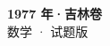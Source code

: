 \documentclass[zihao=-4, a4paper]{ctexart}
\begin{document}
\begin{center}
  {\Large\bfseries 1977 年·吉林卷}\\[4pt]
  {\large 数学 · 试题版}
\end{center}
\medskip
{}

\end{document}
